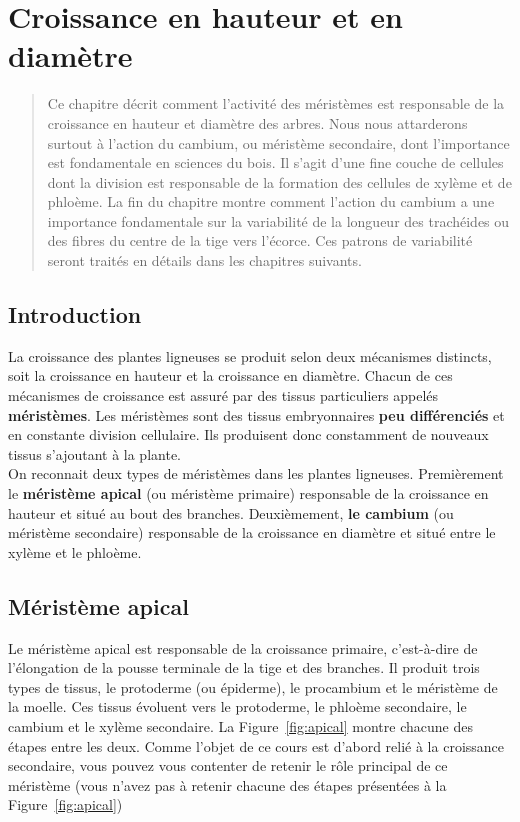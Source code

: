 

\chapter{Croissance en hauteur et en diamètre}

\begin{abstract}
Ce chapitre décrit comment l'activité des méristèmes est responsable de la croissance en hauteur et diamètre des arbres. Nous nous attarderons surtout à l'action du cambium, ou méristème secondaire, dont l'importance est fondamentale en sciences du bois. Il s'agit d'une fine couche de cellules dont la division est responsable de la formation des cellules de xylème et de phloème. La fin du chapitre montre comment l'action du cambium a une importance fondamentale sur la variabilité de la longueur des trachéides ou des fibres du centre de la tige vers l'écorce. Ces patrons de variabilité seront traités en détails dans les chapitres suivants. 
\end{abstract}

\minitoc

\section{Introduction}

La croissance des plantes ligneuses se produit selon deux mécanismes distincts, soit la croissance en hauteur et la croissance en diamètre. Chacun de ces mécanismes de croissance est assuré par des tissus particuliers appelés \textbf{méristèmes}. Les méristèmes sont des tissus embryonnaires \textbf{peu différenciés} et en constante division cellulaire. Ils produisent donc constamment de nouveaux tissus s'ajoutant à la plante.\\

On reconnait deux types de méristèmes dans les plantes ligneuses. Premièrement le \textbf{méristème apical} (ou méristème primaire) responsable de la croissance en hauteur et situé au bout des branches. Deuxièmement, \textbf{le cambium} (ou méristème secondaire) responsable de la croissance en diamètre et situé entre le xylème et le phloème.

\section{Méristème apical}

Le méristème apical est responsable de la croissance primaire, c'est-à-dire de l'élongation de la pousse terminale de la tige et des branches. Il produit trois types de tissus, le protoderme (ou épiderme), le procambium et le méristème de la moelle. Ces tissus évoluent vers le protoderme, le phloème secondaire, le cambium et le xylème secondaire. La Figure~\ref{fig:apical} montre chacune des étapes entre les deux. Comme l'objet de ce cours est d'abord relié à la croissance secondaire, vous pouvez vous contenter de retenir le rôle principal de ce méristème (vous n'avez pas à retenir chacune des étapes présentées à la Figure~\ref{fig:apical})

